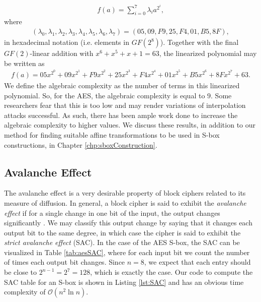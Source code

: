\begin{align*}
f(a) = \sum_{i = 0}^{7}\lambda_i a^{2^{i}},
\end{align*}
where
\begin{align*}
(\lambda_0, \lambda_1, \lambda_2, \lambda_3, \lambda_4, \lambda_5, \lambda_6, \lambda_7) = (05, 09, F9, 25, F4, 01, B5, 8F),
\end{align*}
in hexadecimal notation (i.e. elements in $GF(2^8)$). Together with the final $GF(2)$-linear addition with $x^6 + x^5 + x + 1 = 63$,
the linearized polynomial may be written as
\begin{align*}
f(a) = 05x^{2^{0}} + 09x^{2^{1}} + F9x^{2^{2}} + 25x^{2^{3}} + F4x^{2^{4}} + 01x^{2^{5}} + B5x^{2^{6}} + 8Fx^{2^{7}} + 63.
\end{align*}
We define the algebraic complexity as the number of terms in this linearized polynomial. So, for the AES, the algebraic complexity is equal to $9$. Some researchers fear that this is too low and may render variations of interpolation attacks successful. As such, there has been ample work done to increase the algebraic complexity to higher values. We discuss these results, in addition to our method for finding suitable affine transformations to be used in S-box constructions, in Chapter \ref{chp:sboxConstruction}.

\subsection{Avalanche Effect}
The avalanche effect is a very desirable property of block ciphers related to its measure of diffusion. In general, a block cipher is said to exhibit the \emph{avalanche effect} if for a single change in one bit of the input, the output changes significantly \cite{Webster86-1}. We may classify this output change by saying that it changes each output bit to the same degree, in which case the cipher is said to exhibit the \emph{strict avalanche effect} (SAC). In the case of the AES S-box, the SAC can be visualized in Table \ref{tab:aesSAC}, where for each input bit we count the number of times each output bit changes. Since $n = 8$, we expect that each entry should be close to $2^{n - 1} = 2^7 = 128$, which is exactly the case. Our code to compute the SAC table for an S-box is shown in Listing \ref{lst:SAC} and has an obvious time complexity of $\mathcal{O}(n^2\ln n)$.


